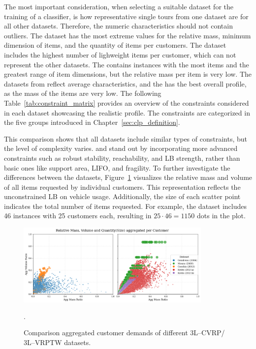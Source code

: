 

The most important consideration, when selecting a suitable dataset for the training of a classifier,
is how representative single tours from one dataset are for all other datasets. Therefore, the numeric characteristics
should not contain outliers. The \gendreauDataSetText dataset has the most extreme values for the relative mass, minimum dimension of items,
and the quantity of items per customers. The \mouraDataSetText dataset includes the highest number of lighweight items per customer,
which can not represent the other datasets. The \ceschiaDataSetText contains instances with the most items and the greatest range
of item dimensions, but the relative mass per item is very low. The datasets from \citeauthor*{krebs_advanced_2021}
reflect average characteristics, and the \krebsADataSetText has the best overall profile, as the mass of the \krebsBDataSetText items are very low.
The following Table~\ref{tab:constraint_matrix} provides an overview of the constraints considered
in each dataset showcasing the realistic profile. The constraints are categorized in the five groups introduced
in Chapter~\ref{sec:clp_definition}.
\clearpage


This comparison shows that all datasets include similar types of constraints, but the level
of complexity varies. \krebsADataSetText and \ceschiaDataSetText stand out by incorporating
more advanced constraints such as robust stability, reachability, and LB strength, rather than
basic ones like support area, \gls{LIFO}, and fragility. To further investigate the differences
between the datasets, Figure~\ref{fig:dataset_comparison} visualizes the relative mass and
volume of all items requested by individual customers. This representation reflects the
unconstrained \gls{LB} on vehicle usage. Additionally, the size of each scatter point indicates
the total number of items requested. For example, the \mouraDataSetText dataset includes 46 instances with 25
customers each, resulting in $25 \cdot 46 = 1150$ dots in the plot.

\begin{figure}[ht]
    \centering
    \includegraphics[width=0.85\textwidth]{pictures/comparison_datasets_3lcvrp.png}
    \caption{Comparison aggregated customer demands of different 3L--CVRP/ 3L--VRPTW datasets.}.
    \label{fig:dataset_comparison}
\end{figure}

